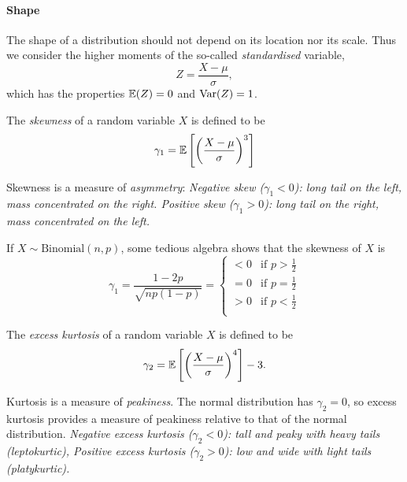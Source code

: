 \paragraph{Shape}
The shape of a distribution should not depend on its location nor its scale. Thus we consider the higher moments of the so-called \emph{standardised} variable,
\[
Z = \frac{X-\mu}{\sigma},
\]
which has the properties $\mathbb{E}(Z)=0$ and $\text{Var}(Z)=1$.

\begin{definition}
The \emph{skewness} of a random variable $X$ is defined to be
\[
\gamma_1 = \expe\left[\left(\frac{X-\mu}{\sigma}\right)^3\right] %
\]
\end{definition}

Skewness is a measure of \emph{asymmetry}:
\bit
\it Negative skew ($\gamma_1 < 0$): long tail on the left, mass concentrated on the right.
\it Positive skew ($\gamma_1 > 0$): long tail on the right, mass concentrated on the left.
\eit

\begin{example}\label{ex:skewness_binomial}
If $X\sim\text{Binomial}(n,p)$, some tedious algebra shows that the skewness of $X$ is 
\[
\gamma_1 = \frac{1-2p}{\sqrt{np(1-p)}} = \begin{cases}
	< 0 	& \text{if } p > \frac{1}{2} \\
	= 0 	& \text{if } p = \frac{1}{2} \\
	> 0 	& \text{if } p < \frac{1}{2} \\
\end{cases}	
\]
\end{example}

\begin{definition}
The \emph{excess kurtosis} of a random variable $X$ is defined to be
\[
\gamma_2 = \expe\left[\left(\frac{X-\mu}{\sigma}\right)^4\right] -3.%
\]
\end{definition}

Kurtosis is a measure of \emph{peakiness}. The normal distribution has $\gamma_2=0$, so excess kurtosis provides a measure of peakiness relative to that of the normal distribution.
\bit
\it Negative excess kurtosis ($\gamma_2 < 0$): tall and peaky with heavy tails (\emph{leptokurtic}),
\it Positive excess kurtosis ($\gamma_2 > 0$): low and wide with light tails (\emph{platykurtic}).
\eit

